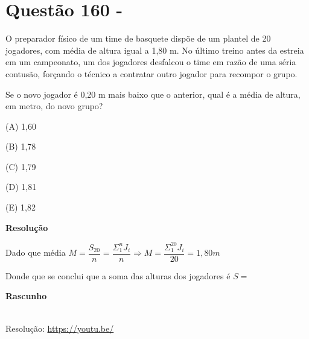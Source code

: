 \section{Questão 160 - }

O preparador físico de um time de basquete dispõe de um plantel de 20 jogadores, com média de altura igual a 1,80 m. No último treino antes da estreia em um campeonato, um dos jogadores desfalcou o time em razão de uma séria contusão, forçando o técnico a contratar outro jogador para recompor o grupo.

Se o novo jogador é 0,20 m mais baixo que o anterior, qual é a média de altura, em metro, do novo grupo?

(A)  1,60

(B)  1,78

(C)  1,79

(D)  1,81

(E)  1,82

\textbf{Resolução}

Dado que média $ M = \dfrac{S_{20}}{n} = \dfrac{\Sigma_{1}^{n} J_{i}}{n} \Rightarrow M = \dfrac{\Sigma_{1}^{20} J_{i}}{20} = 1,80m $

Donde que se conclui que a soma das alturas dos jogadores é $ S =  $

\textbf{Rascunho}

\quad


\begin{center}
    \href{https://youtu.be/}{
    }\\
    Resolução: \url{https://youtu.be/}
\end{center}
